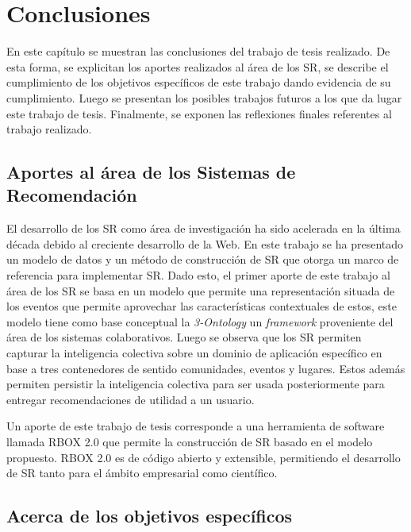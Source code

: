 \chapter{Conclusiones}
\label{cap:conclu}
En este capítulo se muestran las conclusiones del trabajo de tesis realizado. De esta forma, se explicitan los aportes realizados al área de los SR, se describe el cumplimiento de los objetivos específicos de este trabajo dando evidencia de su cumplimiento. Luego se presentan los posibles trabajos futuros a los que da lugar este trabajo de tesis. Finalmente, se exponen las reflexiones finales referentes al trabajo realizado.

\section{Aportes al \'area de los Sistemas de Recomendaci\'on}

El desarrollo de los SR como área de investigación ha sido acelerada en la última década debido al creciente desarrollo de la Web. En este trabajo se ha presentado un modelo de datos y un método de construcción de SR que otorga un marco de referencia para implementar SR. Dado esto, el primer aporte de este trabajo al área de los SR se basa en un modelo que permite una representación situada de los eventos que permite aprovechar las características contextuales de estos, este modelo tiene como base conceptual la \textit{3-Ontology} un \textit{framework} proveniente del área de los sistemas colaborativos. Luego se observa que los SR permiten capturar la inteligencia colectiva sobre un dominio de aplicación específico en base a tres contenedores de sentido comunidades, eventos y lugares. Estos además permiten persistir la inteligencia colectiva para ser usada posteriormente para entregar recomendaciones de utilidad a un usuario.

Un aporte de este trabajo de tesis corresponde a una herramienta de software llamada RBOX 2.0 que permite la construcción de SR basado en el modelo propuesto. RBOX 2.0 es de código abierto y extensible, permitiendo el desarrollo de SR tanto para el ámbito empresarial como científico. 

\section{Acerca de los objetivos espec\'ificos}

